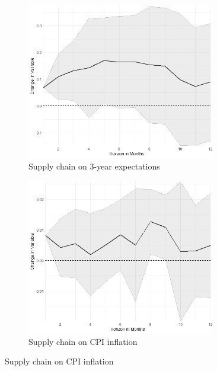 \begin{figure}
	\centering
	\captionsetup{font=footnotesize}
	
	\begin{subfigure}{00.24\textwidth}
		\includegraphics[width=0.9\textwidth]{output/lp/baseline/level/supply_chain/supply_chainonexpectations3y_djn.png}
		\caption{Supply chain on 3-year expectations}
	\end{subfigure}
	\begin{subfigure}{00.24\textwidth}
		\includegraphics[width=0.9\textwidth]{output/lp/baseline/level/supply_chain/supply_chainoninflation_djn.png}
		\caption{Supply chain on CPI inflation}
	\end{subfigure}

\end{figure}
